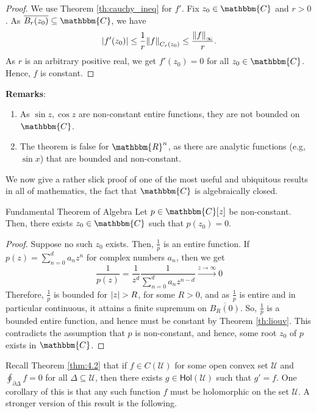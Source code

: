 \documentclass[../ComplexAnalysis_Notes.tex]{subfiles}
\begin{document}
\begin{proof} 
 We use Theorem \ref{th:cauchy_ineq} for \( f' \). Fix \( z_0 \in \mathbbm{C} \) and \( r > 0 \). As \( \overline{B_r(z_0)} \subseteq \mathbbm{C} \), we have
 \[ 
  \abs{f'(z_0)} \leq \frac{1}{r} \norm{f}_{C_r(z_0)} \leq \frac{\norm{f}_{\infty}}{r}.
  \]
  As \( r \) is an arbitrary positive real, we get \( f'(z_0) = 0 \) for all \( z_0 \in \mathbbm{C} \). Hence, \( f \) is constant.
 \end{proof}
\pagebreak

\textbf{Remarks}: \begin{enumerate}[label = (\arabic*)]
  \item As \( \sin z, \cos z \) are non-constant entire functions, they are not bounded on \( \mathbbm{C} \).
  \item The theorem is false for \( \mathbbm{R}^n \), as there are analytic functions (e.g, \( \sin x \)) that are bounded and non-constant.
\end{enumerate}

We now give a rather slick proof of one of the most useful and ubiquitous results in all of mathematics, the fact that \( \mathbbm{C} \) is algebraically closed.

\begin{Thm}{Fundamental Theorem of Algebra}{}
 Let \( p \in \mathbbm{C}[z] \) be non-constant. Then, there exists \( z_0 \in \mathbbm{C} \) such that \( p(z_0) = 0 \).
 \end{Thm}

\begin{proof} 
 Suppose no such \( z_0 \) exists. Then, \( \frac{1}{p} \) is an entire function. If \( p(z) = \sum_{n=0}^{d}a_nz^n \) for complex numbers \( a_n \), then we get
 \[ 
  \frac{1}{p(z)} = \frac{1}{z^d} \frac{1}{\sum_{n=0}^{d}a_{n}z^{n-d}} \xrightarrow{z \to \infty} 0
  \]
  Therefore, \( \frac{1}{p} \) is bounded for \( \abs{z} > R \), for some \( R > 0 \), and as \( \frac{1}{p} \) is entire and in particular continuous, it attains a finite supremum on \( \overline{B_R(0)} \). So, \( \frac{1}{p} \) is a bounded entire function, and hence must be constant by Theorem \ref{th:liouv}. This contradicts the assumption that \( p \) is non-constant, and hence, some root \( z_0 \) of \( p \) exists in \( \mathbbm{C} \).
 \end{proof}

Recall Theorem \ref{thm:4.2} that if \( f \in C(\mathcal{U}) \) for some open convex set \( \mathcal{U} \) and \( \oint_{\partial\Delta} f = 0 \) for all \( \Delta \subseteq \mathcal{U} \), then there exists \( g \in \textsf{Hol}(\mathcal{U}) \) such that \( g' = f \). One corollary of this is that any such function \( f \) must be holomorphic on the set \( \mathcal{U} \). A stronger version of this result is the following.
\end{document}
